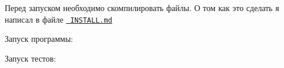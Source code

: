 Перед запуском необходимо скомпилировать файлы. О том как это сделать я написал в файле \href{https://gitlab.com/makarty/edu-works/-/blob/master/system\%20programming/1practical/INSTALL.md}{\texttt{ INSTALL.\+md}}

Запуск программы\+:


\begin{DoxyCode}{0}

\end{DoxyCode}


Запуск тестов\+:


\begin{DoxyCode}{0}

\end{DoxyCode}
 